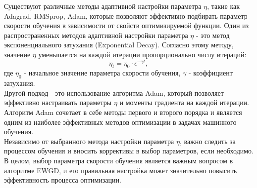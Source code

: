 \documentclass{article}
\begin{document}
Существуют различные методы адаптивной настройки параметра $\eta$, такие как Adagrad, RMSprop, Adam, которые позволяют эффективно подбирать параметр скорости обучения в зависимости от свойств оптимизируемой функции. Один из распространенных методов адаптивной настройки параметра $\eta$ - это метод экспоненциального затухания (Exponential Decay). Согласно этому методу, значение $\eta$ уменьшается на каждой итерации пропорционально числу итераций:
\[\eta_t = \eta_0\cdot\epsilon^{-\gamma t},\]
где $\eta _0$ - начальное значение параметра скорости обучения, $\gamma$ - коэффициент затухания. \\

Другой подход - это использование алгоритма Adam, который позволяет эффективно настраивать параметры $\eta$ и моменты градиента на каждой итерации. Алгоритм Adam сочетает в себе методы первого и второго порядка и является одним из наиболее эффективных методов оптимизации в задачах машинного обучения. \\

Независимо от выбранного метода настройки параметра $\eta$, важно следить за процессом обучения и вносить коррективы в выбор параметров, если необходимо. В целом, выбор параметра скорости обучения является важным вопросом в алгоритме EWGD, и его правильная настройка может значительно повысить эффективность процесса оптимизации. \\
\end{document}
